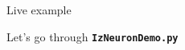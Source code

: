 \documentclass[xcolor=x11names, compress]{beamer}
\renewcommand{\(}{\begin{columns}}
\renewcommand{\)}{\end{columns}}
\newcommand{\<}[1]{\begin{column}{#1}}
\renewcommand{\>}{\end{column}}
\newcommand{\ver}[1]{\texttt{\textbf{#1}}}
\begin{document}
\section{}
\begin{frame}{Live example}

  \Large

  Let's go through \ver{IzNeuronDemo.py}

\end{frame}

{
\begin{frame}
\end{frame}
}
\end{document}
